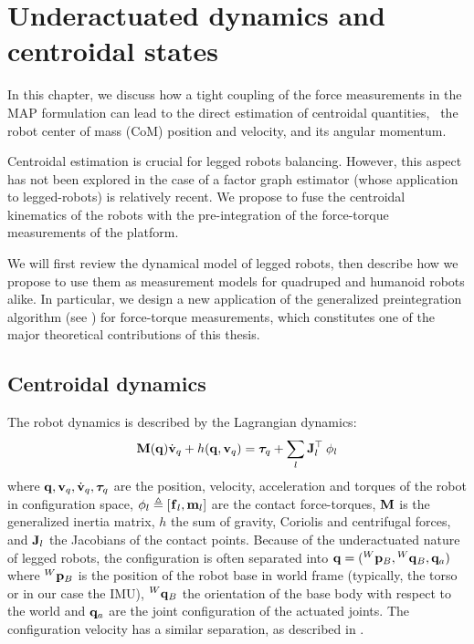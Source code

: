 \chapter{Underactuated dynamics and centroidal states}
\label{chp:underactuade_dynamics}
\minitoc
\bigskip

In this chapter, we discuss how a tight coupling of the force measurements in the MAP formulation can lead to the direct estimation
of centroidal quantities, \ie\ the robot center of mass (CoM) position and velocity, and its angular momentum.


Centroidal estimation is crucial for legged robots balancing. However, this aspect has not been explored in the case of a factor graph 
estimator (whose application to legged-robots) is relatively recent. We propose to fuse the centroidal kinematics of the robots with the pre-integration of the force-torque measurements 
of the platform.

We will first review the dynamical model of legged robots, then describe how we propose to use them as measurement models for quadruped and humanoid robots alike.
In particular, we design a new application of the generalized preintegration algorithm (see ) for force-torque measurements, which constitutes
one of the major theoretical contributions of this thesis.


\section{Centroidal dynamics}
\label{sec:centroidal_dynamics}
The robot dynamics is described by the Lagrangian dynamics:
%
\begin{equation}\label{eq:wbdyn}
  {\bf M}({\bf q}) \dot{{\bf v}}_q + h({\bf q},{\bf v}_q) = \bm\tau_q + \sum_l {\bf J}_l^{\top} \prescript{}{}{\bf \phi}_{l}
\end{equation}
%
where ${\bf q},{\bf v}_q,\dot{{\bf v}}_q,\bm\tau_q$ are the position, velocity, acceleration and torques of the robot in configuration space,
$\prescript{}{}{\bf \phi}_{l} \triangleq [\prescript{}{}{{\bf f}}_{l},{\bf m}_l]$ are the contact force-torques,
${\bf M}$ is the generalized inertia matrix, $h$ the sum of gravity, Coriolis and centrifugal forces, and ${\bf J}_l$ the Jacobians of the contact points.
Because of the underactuated nature of legged robots, the configuration is often separated into ${\bf q}=(\prescript{W}{}{{\bf p}}_{B}, \prescript{W}{}{{\bf q}}_B ,{\bf q}_a)$ where $\prescript{W}{}{{\bf p}}_{B}$ 
is the position of the robot base in world frame (typically, the torso or in our case the IMU), $\prescript{W}{}{{\bf q}}_B$ the orientation of the base body with respect 
to the world and ${\bf q}_a$ are the joint configuration of the actuated joints. The configuration velocity has a similar separation, as described in .

